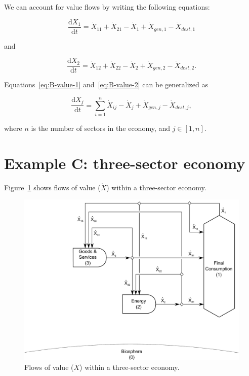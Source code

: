 We can account for value flows by writing
the following equations:

\begin{equation}\label{eq:B-value-1}
	\frac{\mathrm{d}X_{1}}{\mathrm{d}t}
	= \dot{X}_{11}
	+ \dot{X}_{21}
	- \dot{X}_{1}
	+ \dot{X}_{gen,1}
	- \dot{X}_{dest,1}
\end{equation}

\noindent{}and

\begin{equation}\label{eq:B-value-2}
	\frac{\mathrm{d}X_{2}}{\mathrm{d}t}
	= \dot{X}_{12}
	+ \dot{X}_{22}
	- \dot{X}_{2}
	+ \dot{X}_{gen,2}
	- \dot{X}_{dest,2}.
\end{equation}

Equations~\ref{eq:B-value-1} and~\ref{eq:B-value-2}
can be generalized as

\begin{equation}\label{eq:B-value-generalized}
	\frac{\mathrm{d}X_{j}}{\mathrm{d}t}
	= \sum\limits_{i=1}^n \dot{X}_{ij}
	- \dot{X}_{j}
	+ \dot{X}_{gen,j}
	- \dot{X}_{dest,j},
\end{equation}

\noindent{}where $n$ is the number of sectors in the economy, and $j \in [1, n]$.


\section{Example C: three-sector economy} %
\label{sec:value_example_C}

Figure~\ref{fig:C_value} shows flows of value ($\dot{X}$) 
within a three-sector economy. 

\begin{figure}[!ht]
\centering
\includegraphics[width=0.8\linewidth]{Part_2/Chapter_Values/images/3_sector_value.pdf}
\caption[Flows of value within a three-sector economy]{Flows of value ($\dot{X}$) within a three-sector economy.}
\label{fig:C_value}
\end{figure}

